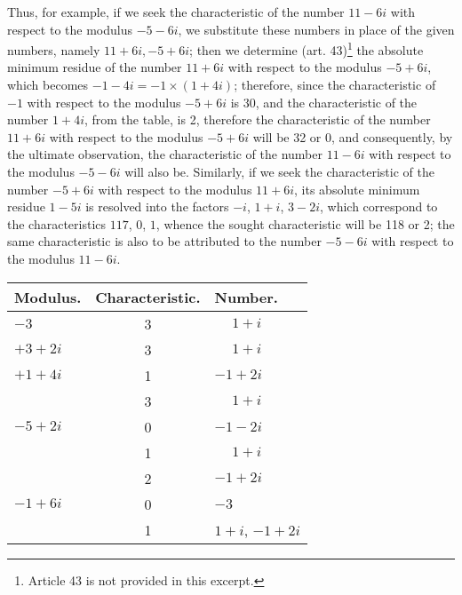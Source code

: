 \documentclass[twoside,12pt, showframe]{memoir}
\begin{document}
Thus, for example, if we seek the characteristic of the number \(11-6 i\) with respect to the modulus \(-5-6 i\), we substitute these numbers in place of the given numbers, namely \(11+6 i,-5+6 i\); then we determine (art. 43)\footnote{Article 43 is not provided in this excerpt.} the absolute minimum residue of the number \(11+6 i\) with respect to the modulus \(-5+6 i\), which becomes \(-1-4 i=-1 \times(1+4 i)\); therefore, since the characteristic of \(-1\) with respect to the modulus \(-5+6 i\) is 30, and the characteristic of the number \(1+4 i\), from the table, is 2, therefore the characteristic of the number \(11+6 i\) with respect to the modulus \(-5+6 i\) will be 32 or 0, and consequently, by the ultimate observation, the characteristic of the number \(11-6 i\) with respect to the modulus \(-5-6 i\) will also be. Similarly, if we seek the characteristic of the number \(-5+6 i\) with respect to the modulus \(11+6 i\), its absolute minimum residue \(1-5 i\) is resolved into the factors \(-i\), \(1+i\), \(3-2 i\), which correspond to the characteristics \(117\), \(0\), \(1\), whence the sought characteristic will be 118 or 2; the same characteristic is also to be attributed to the number \(-5-6 i\) with respect to the modulus \(11-6 i\).
\begin{center}
\begin{tabular}{l|c|l}
Modulus. & Characteristic. & Number. \\
\hline
\(-3\) & 3 & \(\phantom{+}1+i\) \\
\(+3+2 i\) & 3 & \(\phantom{+}1+i\) \\
\(+1+4 i\) & 1 & \(-1+2 i\) \\
 & 3 & \(\phantom{+}1+i\) \\
\(-5+2 i\)& 0 & \(-1-2 i\) \\
 & 1 & \(\phantom{+}1+i\) \\
& 2 & \(-1+2 i\) \\
\(-1+6 i\) & 0 & \(-3\) \\
 &1&\(1+i\), \(-1+2i\)
\end{tabular}
\end{center}
%
\end{document}
